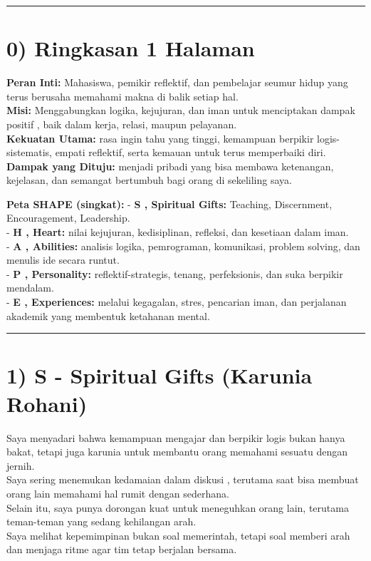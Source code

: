 \documentclass[
  letterpaper,
  DIV=11,
  numbers=noendperiod]{scrreprt}
\begin{document}
\begin{center}\rule{0.5\linewidth}{0.5pt}\end{center}

\section{0) Ringkasan 1 Halaman}\label{ringkasan-1-halaman}

\textbf{Peran Inti:} Mahasiswa, pemikir reflektif, dan pembelajar seumur
hidup yang terus berusaha memahami makna di balik setiap hal.\\
\textbf{Misi:} Menggabungkan logika, kejujuran, dan iman untuk
menciptakan dampak positif , baik dalam kerja, relasi, maupun
pelayanan.\\
\textbf{Kekuatan Utama:} rasa ingin tahu yang tinggi, kemampuan berpikir
logis-sistematis, empati reflektif, serta kemauan untuk terus
memperbaiki diri.\\
\textbf{Dampak yang Dituju:} menjadi pribadi yang bisa membawa
ketenangan, kejelasan, dan semangat bertumbuh bagi orang di sekeliling
saya.

\textbf{Peta SHAPE (singkat):} - \textbf{S , Spiritual Gifts:} Teaching,
Discernment, Encouragement, Leadership.\\
- \textbf{H , Heart:} nilai kejujuran, kedisiplinan, refleksi, dan
kesetiaan dalam iman.\\
- \textbf{A , Abilities:} analisis logika, pemrograman, komunikasi,
problem solving, dan menulis ide secara runtut.\\
- \textbf{P , Personality:} reflektif-strategis, tenang, perfeksionis,
dan suka berpikir mendalam.\\
- \textbf{E , Experiences:} melalui kegagalan, stres, pencarian iman,
dan perjalanan akademik yang membentuk ketahanan mental.

\begin{center}\rule{0.5\linewidth}{0.5pt}\end{center}

\section{1) S - Spiritual Gifts (Karunia
Rohani)}\label{s---spiritual-gifts-karunia-rohani}

Saya menyadari bahwa kemampuan mengajar dan berpikir logis bukan hanya
bakat, tetapi juga karunia untuk membantu orang memahami sesuatu dengan
jernih.\\
Saya sering menemukan kedamaian dalam diskusi , terutama saat bisa
membuat orang lain memahami hal rumit dengan sederhana.\\
Selain itu, saya punya dorongan kuat untuk meneguhkan orang lain,
terutama teman-teman yang sedang kehilangan arah.\\
Saya melihat kepemimpinan bukan soal memerintah, tetapi soal memberi
arah dan menjaga ritme agar tim tetap berjalan bersama.
\end{document}
